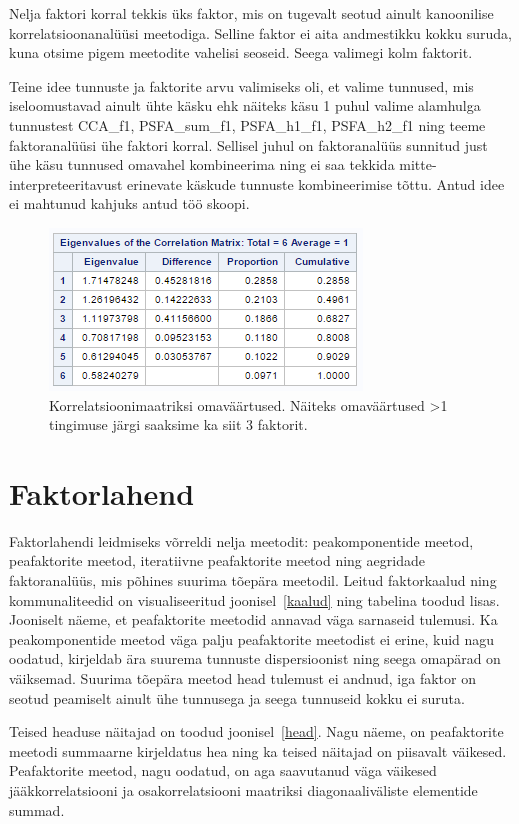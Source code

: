 \documentclass[a4paper,12pt]{report}
\begin{document}
Nelja faktori korral tekkis üks faktor, mis on tugevalt seotud ainult kanoonilise korrelatsioonanalüüsi meetodiga. Selline faktor ei aita andmestikku kokku suruda, kuna otsime pigem meetodite vahelisi seoseid. Seega valimegi kolm faktorit.

Teine idee tunnuste ja faktorite arvu valimiseks oli, et valime tunnused, mis iseloomustavad ainult ühte käsku ehk näiteks käsu 1 puhul valime alamhulga tunnustest CCA\_f1, PSFA\_sum\_f1, PSFA\_h1\_f1, PSFA\_h2\_f1 ning teeme faktoranalüüsi ühe faktori korral. Sellisel juhul on faktoranalüüs sunnitud just ühe käsu tunnused omavahel kombineerima ning ei saa tekkida mitte-interpreteeritavust erinevate käskude tunnuste kombineerimise tõttu. Antud idee ei mahtunud kahjuks antud töö skoopi.

\begin{figure}[h!]
	\centering
	\includegraphics{eigen.png}
	\caption{Korrelatsioonimaatriksi omaväärtused. Näiteks omaväärtused \textgreater 1 tingimuse järgi saaksime ka siit 3 faktorit.}
\end{figure}

\section{Faktorlahend}

Faktorlahendi leidmiseks võrreldi nelja meetodit: peakomponentide meetod, peafaktorite meetod, iteratiivne peafaktorite meetod ning aegridade faktoranalüüs, mis põhines suurima tõepära meetodil. Leitud faktorkaalud ning kommunaliteedid on visualiseeritud joonisel~\ref{kaalud} ning tabelina toodud lisas. Jooniselt näeme, et peafaktorite meetodid annavad väga sarnaseid tulemusi. Ka peakomponentide meetod väga palju peafaktorite meetodist ei erine, kuid nagu oodatud, kirjeldab ära suurema tunnuste dispersioonist ning seega omapärad on väiksemad. Suurima tõepära meetod head tulemust ei andnud, iga faktor on seotud peamiselt ainult ühe tunnusega ja seega tunnuseid kokku ei suruta.

Teised headuse näitajad on toodud joonisel~\ref{head}. Nagu näeme, on peafaktorite meetodi summaarne kirjeldatus hea ning ka teised näitajad on piisavalt väikesed. Peafaktorite meetod, nagu oodatud, on aga saavutanud väga väikesed jääkkorrelatsiooni ja osakorrelatsiooni maatriksi diagonaaliväliste elementide summad. 
\end{document}
